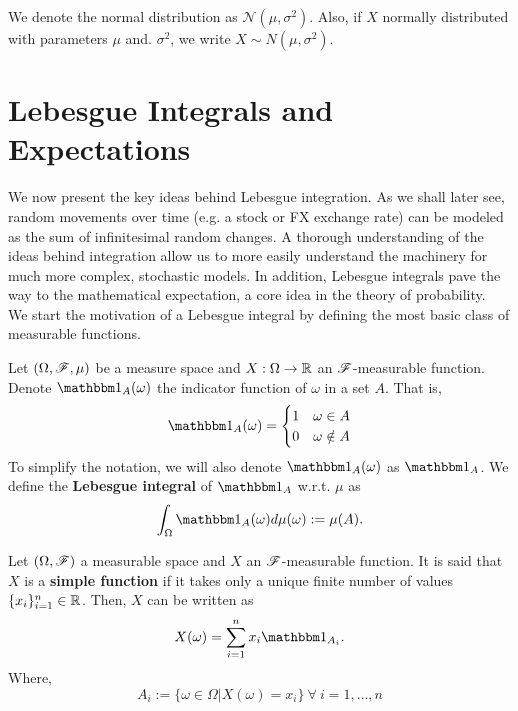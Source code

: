 \documentclass[../TGMAFFIRO.tex]{subfiles}
\begin{document}
We denote the normal distribution as $\mathcal{N}(\mu, \sigma^2)$. Also, if $X$ normally distributed with parameters $\mu$ and. $\sigma^2$, we write $X \sim N(\mu, \sigma^2)$.


\section{Lebesgue Integrals and Expectations}
We now present the key ideas behind Lebesgue integration. As we shall later see, random movements over time (e.g. a stock or FX exchange rate) can be modeled as the sum of infinitesimal random changes. A thorough understanding of the ideas behind integration allow us to more easily understand the machinery for much more complex, stochastic models. In addition, Lebesgue integrals pave the way to the mathematical expectation, a core idea in the theory of probability.\\

We start the motivation of a Lebesgue integral by defining the most basic class of measurable functions.

\begin{definition}
	Let $(\Omega, \mathscr{F}, \mu)$ be a measure space and $X: \Omega \to \mathbb{R}$ an $\mathscr{F}$-measurable function. Denote $\ind_A(\omega)$ the indicator function of $\omega$ in a set $A$. That is,
	\[
	\ind_A(\omega) = 
		\begin{cases}
			1 & \omega \in A \\
			0 & \omega \notin A
		\end{cases}
	\]
	To simplify the notation, we will also denote $\ind_A(\omega)$ as $\ind_A$.
	We define the \textbf{Lebesgue integral} of $\ind_A$ w.r.t. $\mu$ as
	\begin{equation}
		\int_\Omega \ind_A(\omega) d\mu(\omega) := \mu(A).
	\end{equation}
	
\end{definition}

\begin{definition}
	Let $(\Omega, \mathscr{F})$ a measurable space and $X$ an $\mathscr{F}$-measurable function. It is said that $X$ is a \textbf{simple function} if it takes only a unique finite number of values $\{x_i\}_{i=1}^{n} \in \mathbb{R}$. Then, $X$ can be written as
	\begin{equation}
		X(\omega) = \sum_{i=1}^{n}x_i\ind_{A_i}.
	\end{equation}
	Where,
	\[
		A_i := \{\omega \in \Omega | X(\omega) = x_i\} \ \forall \ i = 1, \ldots, n
	\]
\end{definition}
\end{document}

